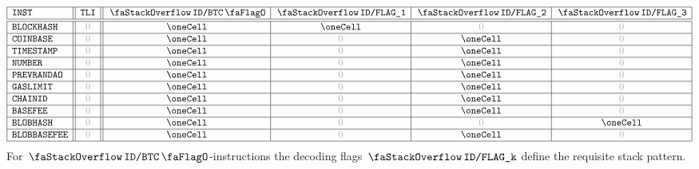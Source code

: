 \[
	\begin{array}{|l||c||c|c|c|c|}
		\hline
		\INST              & \tli  & \stackDecBtcFlag & \decFlag{1} & \decFlag{2} & \decFlag{3} \\ \hline\hline
		\inst{BLOCKHASH}   & \zero & \oneCell         & \oneCell    & \zero       & \zero       \\ \hline
		\inst{COINBASE}    & \zero & \oneCell         & \zero       & \oneCell    & \zero       \\ \hline
		\inst{TIMESTAMP}   & \zero & \oneCell         & \zero       & \oneCell    & \zero       \\ \hline
		\inst{NUMBER}      & \zero & \oneCell         & \zero       & \oneCell    & \zero       \\ \hline
		\inst{PREVRANDAO}  & \zero & \oneCell         & \zero       & \oneCell    & \zero       \\ \hline
		\inst{GASLIMIT}    & \zero & \oneCell         & \zero       & \oneCell    & \zero       \\ \hline
		\inst{CHAINID}     & \zero & \oneCell         & \zero       & \oneCell    & \zero       \\ \hline
		\inst{BASEFEE}     & \zero & \oneCell         & \zero       & \oneCell    & \zero       \\ \hline
		\inst{BLOBHASH}    & \zero & \oneCell         & \zero       & \zero       & \oneCell    \\ \hline
		\inst{BLOBBASEFEE} & \zero & \oneCell         & \zero       & \oneCell    & \zero       \\ \hline
	\end{array}
\]
\saNote{}
For
$\stackDecBtcFlag$-instructions the decoding flags
$\decFlag{k}$ define the requisite stack pattern.
